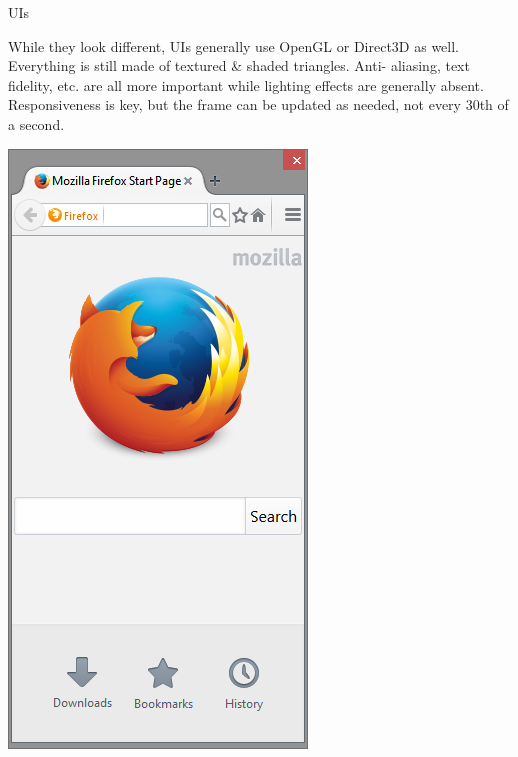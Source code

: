 \documentclass{lug}
\newcommand{\splitslide}[4]{
    \noindent
    \begin{minipage}{#1 \textwidth - #2 }
        #3
    \end{minipage}%
    \hspace{ \dimexpr #2 * 2 \relax }%
    \begin{minipage}{\textwidth - #1 \textwidth - #2 }
        #4
    \end{minipage}
}
\begin{document}
\begin{frame}{UIs}
   \splitslide{0.7}{.7em}{
        \small

        While they look different, UIs generally use OpenGL or Direct3D as
        well. Everything is still made of textured \& shaded triangles. Anti-%
        aliasing, text fidelity, etc. are all more important while lighting
        effects are generally absent. Responsiveness is key, but the frame can
        be updated as needed, not every 30th of a second.

    }{
        \includegraphics[width=\textwidth]{graphics/firefox_start}
    }
\end{frame}
\end{document}
